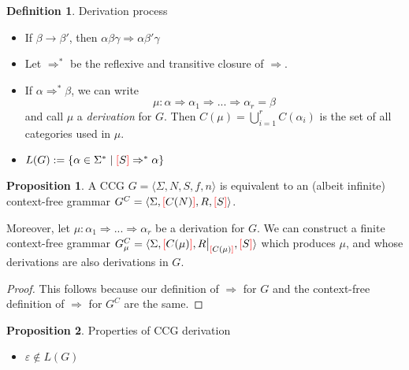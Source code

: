 \documentclass[12pt]{extarticle}
\newcommand\restr[2]{{%
  \left.\kern-\nulldelimiterspace %
  #1 %
  \vphantom{\big|} %
  \right|_{#2} %
  }}
\theoremstyle{definition} \newtheorem{defn}{Definition}
\theoremstyle{definition} \newtheorem{prop}{Proposition}
\newcommand{\lb}{\textcolor{red}{[}}
\newcommand{\rb}{\textcolor{red}{]}}
\begin{document}
\begin{defn}
    Derivation process
    \begin{itemize}
        \item If $\beta \rightarrow \beta'$, then $\alpha \beta \gamma \Rightarrow \alpha \beta' \gamma$
        \item Let $\Rightarrow^*$ be the reflexive and transitive closure of $\Rightarrow$.
        \item If $\alpha \Rightarrow^* \beta$, we can write
            \[ \mu: \alpha \Rightarrow \alpha_1 \Rightarrow ... \Rightarrow \alpha_r = \beta \]
            and call $\mu$ a \emph{derivation} for $G$. Then $C(\mu) = \bigcup\limits_{i=1}^{r} C(\alpha_i)$
            is the set of all categories used in $\mu$.
        \item $L(G) := \{ \alpha \in \Sigma^* \mid \lb S \rb \Rightarrow^* \alpha \}$
    \end{itemize}
\end{defn}

\begin{prop}\label{prop:cfg}
    A CCG $G = \langle \Sigma, N, S, f, n \rangle$ is equivalent to an
    (albeit infinite) context-free grammar
    $G^C = \langle \Sigma, \lb C(N) \rb, R, \lb S \rb \rangle$.

    Moreover, let $\mu: \alpha_1 \Rightarrow ... \Rightarrow \alpha_r$
    be a derivation for $G$.
    We can construct a finite context-free grammar
    $G_\mu^C = \langle \Sigma, \lb C(\mu) \rb, \restr{R}{\lb C(\mu) \rb}, \lb S \rb \rangle$
    which produces $\mu$, and whose derivations are also derivations in $G$.
\end{prop}
\begin{proof}
    This follows because our definition of $\Rightarrow$ for $G$ and the context-free
    definition of $\Rightarrow$ for $G^C$ are the same.
\end{proof}

\begin{prop}
    Properties of CCG derivation
    \begin{itemize}
        \item $\varepsilon \notin L(G)$
    \end{itemize}
\end{prop}
\end{document}
